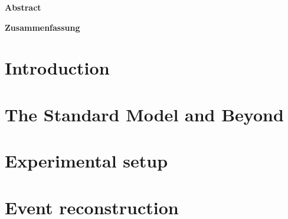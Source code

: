 \documentclass[a4paper, 11pt, twoside, openany]{ThesisStyle}
\begin{document}
\begin{titlepage}

\end{titlepage}

\newpage\thispagestyle{empty}\mbox{}
\newpage\thispagestyle{empty}\mbox{}

\vspace*{\fill}
\begin{center}
\Large
{\color{CadetBlue}\textbf{Abstract}}

\end{center}
\vspace*{\fill}


\newpage\thispagestyle{empty}\mbox{}
\newpage\thispagestyle{empty}\mbox{}

\vspace*{\fill}
\begin{center}
\Large
{\color{CadetBlue}\textbf{Zusammenfassung}}
\end{center}

\vspace*{\fill}

\newpage\thispagestyle{empty}\mbox{}
\normalsize
\tableofcontents

\newpage
{}

\chapter*{Introduction}
\label{ch:Introduction}


\chapter{The Standard Model and Beyond} %
\label{ch:theory}
\vspace*{\fill}\newpage

\vspace*{\fill}\newpage

\chapter{Experimental setup}
\label{ch:CMS}
\vspace*{\fill}\newpage


\chapter{Event reconstruction} %
\label{ch:objreco}
\vspace*{\fill}\newpage

\end{document}
